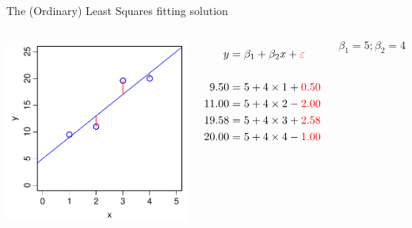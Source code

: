 \documentclass[xcolor=x11names,handout,compress]{beamer}
\renewcommand{\(}{\begin{columns}}
\renewcommand{\)}{\end{columns}}
\newcommand{\<}[1]{\begin{column}{#1}}
\renewcommand{\>}{\end{column}}
\begin{document}
\begin{frame}{The (Ordinary) Least Squares fitting solution}

\begin{columns}[T]

		\includegraphics[width=\textwidth]{JustRight.pdf}
		
		\begin{align*}
		  y  &= \beta_1 + \beta_2 x  + {\color{red} \varepsilon }\\
		  \\
		  9.50  &= 5 + 4 \times 1 + {\color{red} 0.50}\\
		  11.00 &= 5 + 4 \times 2 - {\color{red} 2.00}\\
		  19.58 &= 5 + 4 \times 3 + {\color{red} 2.58}\\
		  20.00 &= 5 + 4 \times 4 - {\color{red} 1.00} 
		\end{align*}
		
		\[\beta_1 = 5; \beta_2=4\]
				
\end{columns}		
\end{frame}

\end{document}

